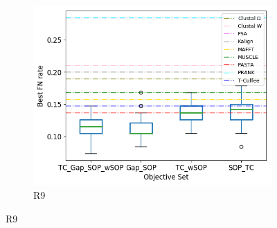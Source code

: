 \begin{figure}[!htbp]
\begin{subfigure}{0.32\textwidth}
		\includegraphics[width=\columnwidth]{Figure/summary/precomputedInit/R9/objset_fnrate_rank}
		\caption{R9}
	\end{subfigure}
	

\end{figure}
